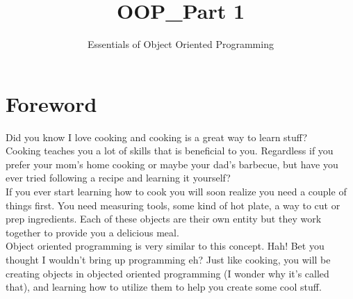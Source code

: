 \documentclass{42-en}
\begin{document}
                           \title{OOP\_Part 1}
                          \subtitle{Essentials of Object Oriented Programming}

\maketitle

\tableofcontents

\chapter{Foreword}

	Did you know I love cooking and cooking is a great way to learn stuff?\\

	Cooking teaches you a lot of skills that is beneficial to you. Regardless
	if you prefer your mom's home cooking or maybe your dad's barbecue, but
	have you ever tried following a recipe and learning it yourself?\\

	If you ever start learning how to cook you will soon realize you need a
	couple of things first. You need measuring tools, some kind of hot plate,
	a way to cut or prep ingredients. Each of these objects are their own
	entity but they work together to provide you a delicious meal.\\

	Object oriented programming is very similar to this concept. Hah! Bet you
	thought I wouldn't bring up programming eh? Just like cooking, you will
	be creating objects in objected oriented programming (I wonder why it's called
	that), and learning how to utilize them to help you create some cool stuff.\\
\end{document}
